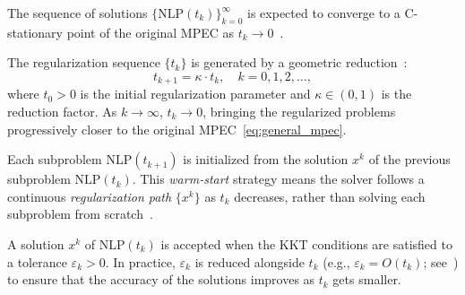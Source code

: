 The sequence of solutions $\{\text{NLP}(t_k)\}_{k=0}^\infty$ is expected to converge to a C-stationary point of the original MPEC as $t_k \to 0$~\cite{Scholtes2001}.

The regularization sequence $\{t_k\}$ is generated by a geometric reduction~\cite{Scholtes2001,HoheiselKanzowSchwartz2013}:
\begin{equation}
  t_{k+1} = \kappa \cdot t_k, \quad k = 0, 1, 2, \ldots,
  \label{eq:param_update}
\end{equation}
where $t_0 > 0$ is the initial regularization parameter and $\kappa \in (0, 1)$ is the reduction factor. As $k \to \infty$, $t_k \to 0$, bringing the regularized problems progressively closer to the original MPEC~\eqref{eq:general_mpec}. 

Each subproblem $\text{NLP}(t_{k+1})$ is initialized from the solution $x^k$ of the previous subproblem $\text{NLP}(t_k)$. This \emph{warm-start} strategy means the solver follows a continuous \emph{regularization path} $\{x^k\}$ as $t_k$ decreases, rather than solving each subproblem from scratch~\cite{RalphWright2004,HoheiselKanzowSchwartz2013}.

A solution $x^k$ of $\text{NLP}(t_k)$ is accepted when the KKT conditions are satisfied to a tolerance $\varepsilon_k > 0$. In practice, $\varepsilon_k$ is reduced alongside $t_k$ (e.g., $\varepsilon_k = O(t_k)$; see~\cite{HoheiselKanzowSchwartz2013,KanzowSchwartz2015}) to ensure that the accuracy of the solutions improves as $t_k$ gets smaller.

